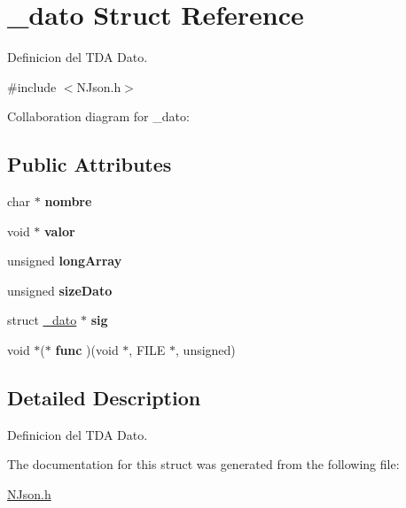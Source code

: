 \hypertarget{struct__dato}{}\section{\+\_\+dato Struct Reference}
\label{struct__dato}


Definicion del T\+DA Dato.  




{\ttfamily \#include $<$N\+Json.\+h$>$}



Collaboration diagram for \+\_\+dato\+:
\subsection*{Public Attributes}
\begin{DoxyCompactItemize}
\item 
char $\ast$ {\bfseries nombre}\hypertarget{struct__dato_ac64670b672e01c617a9a80dee8de09d0}{}\label{struct__dato_ac64670b672e01c617a9a80dee8de09d0}

\item 
void $\ast$ {\bfseries valor}\hypertarget{struct__dato_afd83215031ead3bc57c5df9ecf9f1dd5}{}\label{struct__dato_afd83215031ead3bc57c5df9ecf9f1dd5}

\item 
unsigned {\bfseries long\+Array}\hypertarget{struct__dato_a754c36290959d1bbb2ce23a40e19b1d3}{}\label{struct__dato_a754c36290959d1bbb2ce23a40e19b1d3}

\item 
unsigned {\bfseries size\+Dato}\hypertarget{struct__dato_a21cbcc33caf06fababfabdb663e198a6}{}\label{struct__dato_a21cbcc33caf06fababfabdb663e198a6}

\item 
struct \hyperlink{struct__dato}{\+\_\+dato} $\ast$ {\bfseries sig}\hypertarget{struct__dato_aa13942708e081dca11ab775ec195057c}{}\label{struct__dato_aa13942708e081dca11ab775ec195057c}

\item 
void $\ast$($\ast$ {\bfseries func} )(void $\ast$, F\+I\+LE $\ast$, unsigned)\hypertarget{struct__dato_af449ffa881f3acbdffa5e0d720dc7bf9}{}\label{struct__dato_af449ffa881f3acbdffa5e0d720dc7bf9}

\end{DoxyCompactItemize}


\subsection{Detailed Description}
Definicion del T\+DA Dato. 

The documentation for this struct was generated from the following file\+:\begin{DoxyCompactItemize}
\item 
\hyperlink{NJson_8h}{N\+Json.\+h}\end{DoxyCompactItemize}
